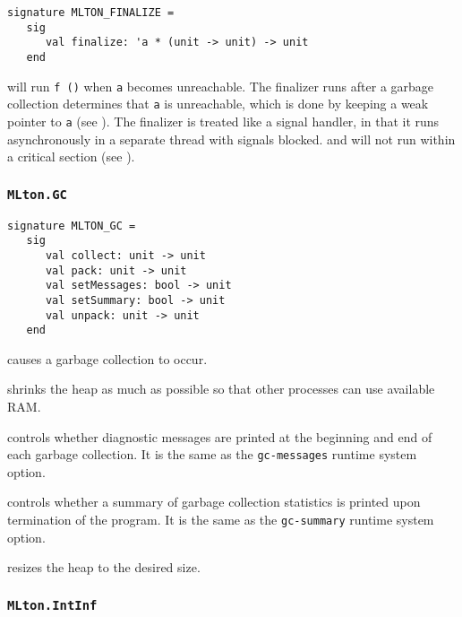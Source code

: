 \begin{verbatim}
signature MLTON_FINALIZE =
   sig
      val finalize: 'a * (unit -> unit) -> unit
   end
\end{verbatim}

\begin{description}

will run {\tt f ()} when {\tt a} becomes unreachable.  The finalizer
runs after a garbage collection determines that {\tt a} is
unreachable, which is done by keeping a weak pointer to {\tt a} (see
).  The finalizer is treated like a signal handler, in
that it runs asynchronously in a separate thread with signals blocked.
and will not run within a critical section (see ).

\end{description}

\subsubsection{{\tt MLton.GC}}
\begin{verbatim}
signature MLTON_GC =
   sig
      val collect: unit -> unit
      val pack: unit -> unit
      val setMessages: bool -> unit
      val setSummary: bool -> unit
      val unpack: unit -> unit
   end
\end{verbatim}

\begin{description}
causes a garbage collection to occur.

shrinks the heap as much as possible so that other processes can use available
RAM.

controls whether diagnostic messages are
printed at the beginning and end of each garbage collection.  It is
the same as the {\tt gc-messages} runtime system option.

controls whether a summary of garbage
collection statistics is printed upon termination of the program.  It
is the same as the {\tt gc-summary} runtime system option.

resizes the heap to the desired size.

\end{description}

\subsubsection{{\tt MLton.IntInf}}

